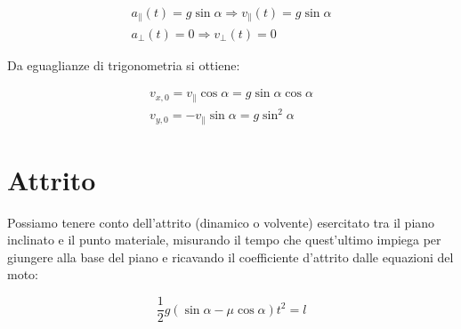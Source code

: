 \documentclass{article}
\begin{document}
\begin{align}
a_\parallel(t) = g \sin\alpha \Rightarrow v_\parallel(t) = g \sin\alpha \\
a_\perp(t) = 0 \Rightarrow v_\perp(t) = 0
\end{align}

Da eguaglianze di trigonometria si ottiene:

\begin{align}
v_{x,0} = v_\parallel\cos\alpha = g \sin\alpha \cos\alpha \\
v_{y,0} = -v_\parallel\sin\alpha = g \sin^2\alpha 
\end{align}

\section{Attrito}
Possiamo tenere conto dell'attrito (dinamico o volvente) esercitato tra il piano inclinato e il punto
materiale, misurando il tempo che quest'ultimo impiega per giungere alla base del piano e ricavando
il coefficiente d'attrito dalle equazioni del moto:

\begin{equation}
\frac{1}{2} g (\sin\alpha - \mu\cos\alpha) t^2 = l
\end{equation}

{}

\end{document}
